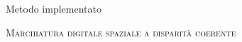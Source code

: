 \documentclass{beamer}
\begin{document}
\begin{section}{Metodo implementato}
\begin{frame}[t]{\textsc{Marchiatura digitale spaziale a disparit\`{a} coerente}}

\end{frame}
\end{section}
\end{document}
